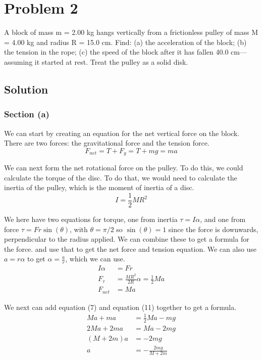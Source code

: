 \documentclass[12pt]{article}
\begin{document}
\pagebreak
\section{Problem 2}
A block of mass m = 2.00 kg hangs vertically from a frictionless pulley of mass M = 4.00 kg and radius R = 15.0 cm. Find: (a) the acceleration of the block; (b) the tension in the rope; (c) the speed of the block after it has fallen 40.0 cm—assuming it started at rest. Treat the pulley as a solid disk.

\subsection{Solution}
\subsubsection{Section (a)}
We can start by creating an equation for the net vertical force on the block. There are two forces: the gravitational force and the tension force.
\begin{equation} F_{net} = T + F_g = T + mg = ma \end{equation}

We can next form the net rotational force on the pulley. To do this, we could calculate the torque of the disc. To do that, we would need to calculate the inertia of the pulley, which is the moment of inertia of a disc.
\begin{equation} I = \frac{1}{2}MR^2 \end{equation}

We here have two equations for torque, one from inertia \(\tau = I\alpha\), and one from force \(\tau = Fr\sin(\theta)\), with $\theta = \pi/2$ so $\sin(\theta) = 1$ since the force is downwards, perpendicular to the radius applied. We can combine these to get a formula for the force. and use that to get the net force and tension equation. We can also use $a = r\alpha$ to get $\alpha = \frac{a}{r}$, which we can use. 
\begin{align}
    I\alpha &=  Fr\\
    F_\tau  &=  \frac{MR^2}{2R}\alpha
        =   \frac{1}{2}Ma\\
    F_{net} &=  Ma
\end{align}

We next can add equation (7) and equation (11) together to get a formula.
\begin{align}
    Ma + ma &=  \frac{1}{2}Ma - mg\\
    2Ma + 2ma   &=  Ma - 2mg\\
    (M + 2m)a   &=  -2mg\\
    a   &=  -\frac{2mg}{M + 2m}
\end{align}
\end{document}
